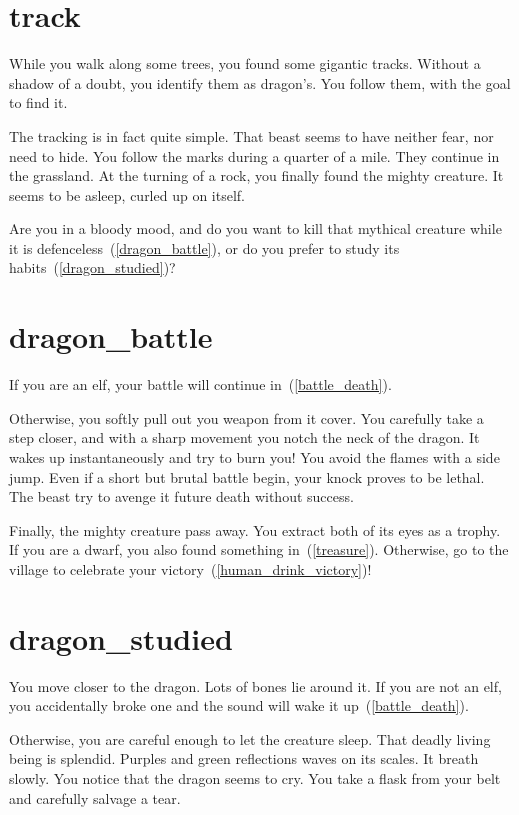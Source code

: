 \section{track}

While you walk along some trees, you found some gigantic tracks. Without a
shadow of a doubt, you identify them as dragon's. You follow them, with
the goal to find it.

The tracking is in fact quite simple. That beast seems to have neither fear, nor
need to hide. You follow the marks during a quarter of a mile. They continue in
the grassland. At the turning of a rock, you finally found the mighty creature.
It seems to be asleep, curled up on itself.

Are you in a bloody mood, and do you want to kill that mythical creature while it
is defenceless~(\ref{dragon_battle}), or do you prefer to study its
habits~(\ref{dragon_studied})?

\section{dragon_battle}

If you are an elf, your battle will continue in~(\ref{battle_death}).

\medbreak

Otherwise, you softly pull out you weapon from it cover. You carefully take a
step closer, and with a sharp movement you notch the neck of the dragon. It wakes
up instantaneously and try to burn you! You avoid the flames with a side jump.
Even if a short but brutal battle begin, your knock proves to be lethal. The
beast try to avenge it future death without success.

Finally, the mighty creature pass away. You extract both of its eyes as a
trophy. If you are a dwarf, you also found something in~(\ref{treasure}).
Otherwise, go to the village to celebrate your
victory~(\ref{human_drink_victory})!

\section{dragon_studied}

You move closer to the dragon. Lots of bones lie around it. If you are not an
elf, you accidentally broke one and the sound will wake it
up~(\ref{battle_death}).

\medbreak

Otherwise, you are careful enough to let the creature sleep. That deadly living
being is splendid. Purples and green reflections waves on its scales. It breath
slowly. You notice that the dragon seems to cry. You take a flask from your belt
and carefully salvage a tear.

